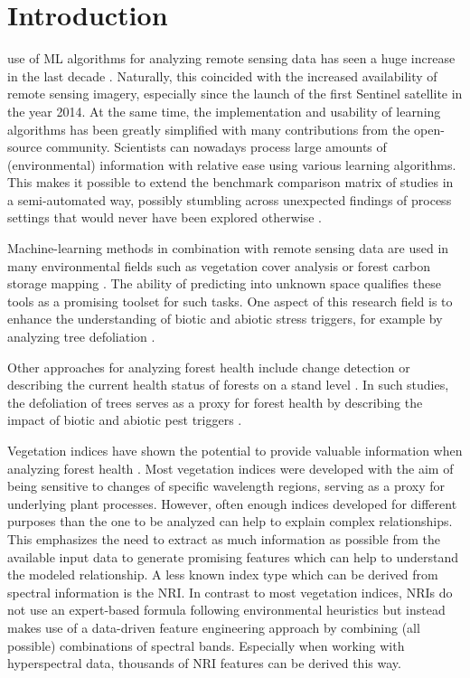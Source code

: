 \documentclass[letterpaper, peerreview, draftcls]{IEEEtran}
\begin{document}
\section{Introduction}


 use of \ac{ML} algorithms for analyzing remote sensing data has seen a huge increase in the last decade \cite{lary2016}.
Naturally, this coincided with the increased availability of remote sensing imagery, especially since the launch of the first Sentinel satellite in the year 2014.
At the same time, the implementation and usability of learning algorithms has been greatly simplified with many contributions from the open-source community.
Scientists can nowadays process large amounts of (environmental) information with relative ease using various learning algorithms.
This makes it possible to extend the benchmark comparison matrix of studies in a semi-automated way, possibly stumbling across unexpected findings of process settings that would never have been explored otherwise \cite{ma2015}.


Machine-learning methods in combination with remote sensing data are used in many environmental fields such as vegetation cover analysis or forest carbon storage mapping \cite{mascaro2014, urban2018}.
The ability of predicting into unknown space qualifies these tools as a promising toolset for such tasks.
One aspect of this research field is to enhance the understanding of biotic and abiotic stress triggers, for example by analyzing tree defoliation \cite{hawrylo2018}.

Other approaches for analyzing forest health include change detection \cite{zhang2016} or describing the current health status of forests on a stand level \cite{townsend2012}.
In such studies, the defoliation of trees serves as a proxy for forest health by describing the impact of biotic and abiotic pest triggers \cite{townsend2012, goodbody2018}.

Vegetation indices have shown the potential to provide valuable information when analyzing forest health \cite{jiang2014, adamczyk2015}.
Most vegetation indices were developed with the aim of being sensitive to changes of specific wavelength regions, serving as a proxy for underlying plant processes.
However, often enough indices developed for different purposes than the one to be analyzed can help to explain complex relationships.
This emphasizes the need to extract as much information as possible from the available input data to generate promising features which can help to understand the modeled relationship.
A less known index type which can be derived from spectral information is the \ac{NRI}.
In contrast to most vegetation indices, \ac{NRI}s do not use an expert-based formula following environmental heuristics but instead makes use of a data-driven feature engineering approach by combining (all possible) combinations of spectral bands.
Especially when working with hyperspectral data, thousands of \ac{NRI} features can be derived this way.
\end{document}
